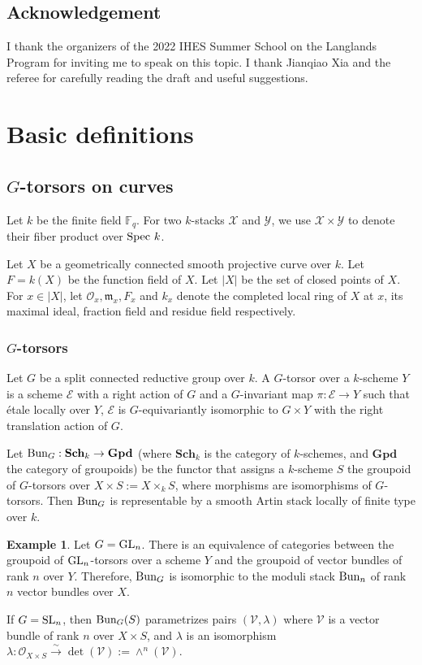 \documentclass[11pt]{amsart}
\numberwithin{equation}{section}
\theoremstyle{plain}
\theoremstyle{definition}
\newtheorem{exam}[subsubsection]{Example}
\def\FF{\mathbb{F}}
\newcommand\cE{\mathcal{E}}
\newcommand\cO{\mathcal{O}}
\newcommand\cV{\mathcal{V}}
\newcommand\cX{\mathcal{X}}
\newcommand\cY{\mathcal{Y}}
\newcommand\fm{\mathfrak{m}}
\newcommand{\Bun}{\textup{Bun}}
\newcommand\Spec{\textup{Spec}\ }
\newcommand\GL{\textup{GL}}
\newcommand\SL{\textup{SL}}
\newcommand{\isom}{\stackrel{\sim}{\to}}
\newcommand\sss{\subsubsection}
\renewcommand{\l}{\lambda}
\newcommand\Sch{\mathbf{Sch}}
\newcommand\Gpd{\mathbf{Gpd}}
\begin{document}

\subsection*{Acknowledgement} 
I thank the organizers of the 2022 IHES Summer School on the Langlands Program for inviting me to speak on this topic. I thank Jianqiao Xia and the referee for carefully reading the draft and useful suggestions.



\section{Basic definitions}\label{s:def}

\subsection{$G$-torsors on curves}
Let $k$ be the finite field $\FF_{q}$. For two $k$-stacks $\cX$ and $\cY$, we use $\cX\times\cY$ to denote their fiber product over $\Spec k$.

Let $X$ be a geometrically connected smooth projective curve over $k$. Let $F=k(X)$ be the function field of $X$. Let $|X|$ be the set of closed points of $X$. For $x\in |X|$, let $\cO_{x}, \fm_{x}, F_{x}$ and $k_{x}$ denote the completed local ring of $X$ at $x$, its maximal ideal, fraction field and residue field respectively.

\sss{$G$-torsors} Let $G$ be a split connected reductive group over $k$. A $G$-torsor over a $k$-scheme $Y$ is a scheme $\cE$ with a right action of $G$ and a $G$-invariant map $\pi: \cE
\to Y$ such that \'etale locally over $Y$, $\cE$ is $G$-equivariantly isomorphic to $G\times Y$ with the right translation action of $G$. 


Let $\Bun_{G}: \Sch_{k}\to \Gpd$ (where $\Sch_{k}$ is the category of $k$-schemes, and $\Gpd$ the category of groupoids) be the functor that assigns a $k$-scheme $S$ the groupoid of $G$-torsors over $X\times S:=X\times_{k}S$, where morphisms are  isomorphisms of $G$-torsors. Then $\Bun_{G}$ is representable by a smooth Artin stack locally of finite type over $k$. 

\begin{exam} Let $G=\GL_{n}$. There is an equivalence of categories between the groupoid of $\GL_{n}$-torsors over a scheme $Y$ and the groupoid of vector bundles of rank $n$ over $Y$. Therefore, $\Bun_{G}$ is isomorphic to the moduli stack $\Bun_{n}$ of rank $n$ vector bundles over $X$.

If $G=\SL_{n}$, then $\Bun_{G}(S)$ parametrizes pairs $(\cV, \l)$ where $\cV$ is a vector bundle of rank $n$ over $X\times S$, and $\l$ is an isomorphism $\l: \cO_{X\times S}\isom \det(\cV):=\wedge^{n}(\cV)$.
\end{exam}
\end{document}
